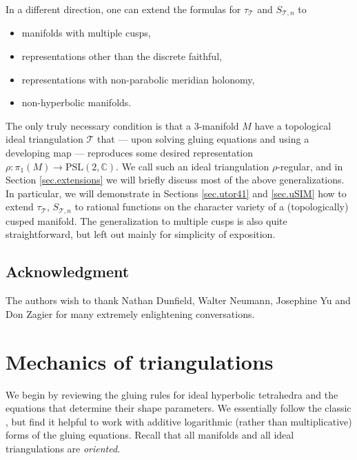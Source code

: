 \documentclass[12pt]{amsart}
\newcommand{\lbl}{\label}
\theoremstyle{definition}
\def\PSL{\mathrm{PSL}}
\newcommand{\CT}{\mathcal{T}}
\newcommand{\C}{\mathbb{C}}
\numberwithin{equation}{section}
\begin{document}
In a different direction, one can extend the formulas for $\tau_\CT$ and $S_{\CT,n}$ to
%
\begin{itemize}
\item[--] manifolds with multiple cusps,
\item[--] representations other than the discrete faithful,
\item[--] representations with non-parabolic meridian holonomy,
\item[--] non-hyperbolic manifolds.
\end{itemize}
%
The only truly necessary condition is that a 3-manifold $M$ have a topological ideal triangulation $\CT$ that --- upon solving gluing equations and using a developing map --- reproduces some desired representation $\rho:\pi_1(M)\to \PSL(2,\C)$. We call such an ideal triangulation $\rho$-regular, and in Section \ref{sec.extensions} we will briefly discuss most of the above generalizations. In particular, we will demonstrate in Sections \ref{sec.utor41} and \ref{sec.uSIM} how to extend $\tau_\CT,\,S_{\CT,n}$ to rational functions on the character variety of a (topologically) cusped manifold. The generalization to multiple cusps is also quite straightforward, but left out mainly for simplicity of exposition.









\subsection*{Acknowledgment}
The authors wish to thank Nathan Dunfield, Walter Neumann, Jose\-phine Yu
and Don Zagier for many extremely enlightening conversations.







\section{Mechanics of triangulations}
\lbl{sec.triang}


We begin by reviewing the gluing rules for ideal hyperbolic tetrahedra and 
the equations that determine their shape parameters. We essentially follow 
the classic \cite{Th, NZ}, but find it helpful to work with 
additive logarithmic (rather than multiplicative) forms of the gluing  equations.
Recall that all manifolds and all ideal triangulations are {\em oriented}.
\end{document}
